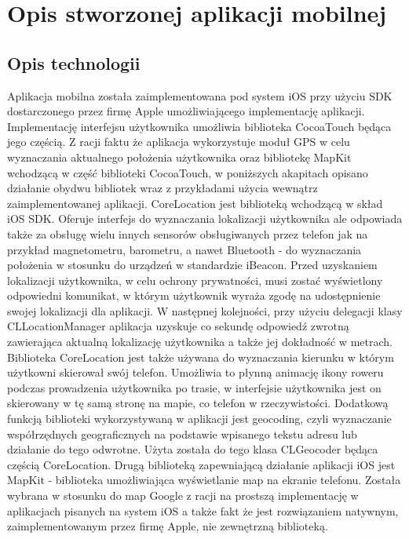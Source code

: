 \section{Opis stworzonej aplikacji mobilnej}

\subsection{Opis technologii}

Aplikacja mobilna została zaimplementowana pod system iOS przy użyciu SDK dostarczonego przez firmę Apple umożliwiającego implementację aplikacji. Implementację interfejsu użytkownika umożliwia biblioteka CocoaTouch będąca jego częścią. Z racji faktu że aplikacja wykorzystuje moduł GPS w celu wyznaczania aktualnego położenia użytkownika oraz bibliotekę MapKit wchodzącą w część biblioteki CocoaTouch, w poniższych akapitach opisano działanie obydwu bibliotek wraz z przykładami użycia wewnątrz zaimplementowanej aplikacji. \newline
CoreLocation jest biblioteką wchodzącą w skład iOS SDK. Oferuje interfejs do wyznaczania lokalizacji użytkownika ale odpowiada także za obsługę wielu innych sensorów obsługiwanych przez telefon jak na przykład magnetometru, barometru, a nawet Bluetooth - do wyznaczania położenia w stosunku do urządzeń w standardzie iBeacon. Przed uzyskaniem lokalizacji użytkownika, w celu ochrony prywatności, musi zostać wyświetlony odpowiedni komunikat, w którym użytkownik wyraża zgodę na udostępnienie swojej lokalizacji dla aplikacji. W następnej kolejności, przy użyciu delegacji klasy CLLocationManager aplikacja uzyskuje co sekundę odpowiedź zwrotną zawierająca aktualną lokalizację użytkownika a także jej dokładność w metrach. Biblioteka CoreLocation jest także używana do wyznaczania kierunku w którym użytkowni skierował swój telefon. Umożliwia to płynną animację ikony roweru podczas prowadzenia użytkownika po trasie, w interfejsie użytkownika jest on skierowany w tę samą stronę na mapie, co telefon w rzeczywistości. Dodatkową funkcją biblioteki wykorzystywaną w aplikacji jest geocoding, czyli wyznaczanie współrzędnych geograficznych na podstawie wpisanego tekstu adresu lub działanie do tego odwrotne. Użyta została do tego klasa CLGeocoder będąca częścią CoreLocation. \newline
Drugą biblioteką zapewniającą działanie aplikacji iOS jest MapKit - biblioteka umożliwiająca wyświetlanie map na ekranie telefonu. Została wybrana w stosunku do map Google z racji na prostszą implementację w aplikacjach pisanych na system iOS a także fakt że jest rozwiązaniem natywnym, zaimplementowanym przez firmę Apple, nie zewnętrzną biblioteką.

